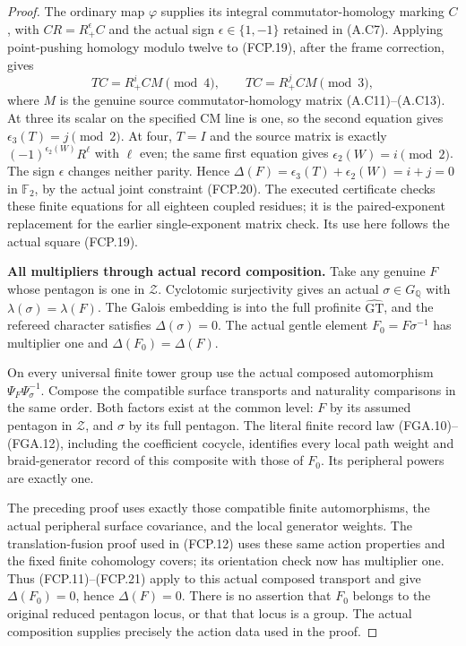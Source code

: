 \begin{proof}
The ordinary map $\varphi$ supplies its integral
commutator-homology marking $C$, with
$CR=R_+^\epsilon C$ and the actual sign
$\epsilon\in\{1,-1\}$ retained in (A.C7).
Applying point-pushing homology modulo twelve to
(FCP.19), after the frame correction, gives
\[
               TC=R_+^iCM\pmod4,\qquad
               TC=R_+^jCM\pmod3,
                                                               \tag{FCP.21}
\]
where $M$ is the genuine source commutator-homology
matrix (A.C11)--(A.C13).
At three its scalar on the specified CM line is one,
so the second equation gives $\epsilon_3(T)=j\pmod2$.
At four, $T=I$ and the source matrix is exactly
$(-1)^{\epsilon_2(W)}R^\ell$ with $\ell$ even; the same
first equation gives $\epsilon_2(W)=i\pmod2$.
The sign $\epsilon$ changes neither parity.  Hence
$\Delta(F)=\epsilon_3(T)+\epsilon_2(W)=i+j=0$ in
$\mathbb F_2$, by the actual joint constraint (FCP.20).
The executed certificate
checks these finite equations for all eighteen coupled
residues; it is the paired-exponent replacement for the
earlier single-exponent matrix check.
Its use here follows the actual square (FCP.19).

\par\medskip\noindent\textbf{All multipliers through actual record composition.}\quad
Take any genuine $F$ whose pentagon is one in $\mathcal Z$.
Cyclotomic surjectivity gives an actual
$\sigma\in G_{\mathbb Q}$ with
$\lambda(\sigma)=\lambda(F)$.
The Galois embedding is into the full profinite
$\widehat{\mathrm{GT}}$, and the refereed character
satisfies $\Delta(\sigma)=0$.
The actual gentle element $F_0=F\sigma^{-1}$ has
multiplier one and $\Delta(F_0)=\Delta(F)$.

On every universal finite tower group use the actual
composed automorphism $\Psi_F\Psi_\sigma^{-1}$.
Compose the compatible surface transports and naturality
comparisons in the same order.  Both factors exist at
the common level: $F$ by its assumed pentagon in
$\mathcal Z$, and $\sigma$ by its full pentagon.
The literal finite record law (FGA.10)--(FGA.12),
including the coefficient cocycle, identifies every
local path weight and braid-generator record of this
composite with those of $F_0$.
Its peripheral powers are exactly one.

The preceding proof uses exactly those compatible finite
automorphisms, the actual peripheral surface covariance,
and the local generator weights.
The translation-fusion proof used in (FCP.12) uses these
same action properties and the fixed finite cohomology
covers; its orientation check now has multiplier one.
Thus (FCP.11)--(FCP.21) apply to this actual composed
transport and give $\Delta(F_0)=0$, hence $\Delta(F)=0$.
There is no assertion that $F_0$ belongs to the original
reduced pentagon locus, or that that locus is a group.
The actual composition supplies precisely the action
data used in the proof.
\end{proof}

